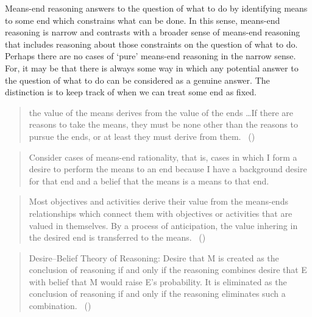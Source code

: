 \documentclass[10pt]{article}
\begin{document}
\newpage



Means-end reasoning answers to the question of what to do by identifying means to some end which constrains what can be done.
In this sense, means-end reasoning is narrow and contrasts with a broader sense of means-end reasoning that includes reasoning about those constraints on the question of what to do.
Perhaps there are no cases of `pure' means-end reasoning in the narrow sense.
For, it may be that there is always some way in which any potential answer to the question of what to do can be considered as a genuine answer.
The distinction is to keep track of when we can treat some end as fixed.







\begin{quote}
  the value of the means derives from the value of the ends \dots If there are reasons to take the means, they must be none other than the reasons to pursue the ends, or at least they must derive from them.\nolinebreak
  \mbox{ }\hfill(\cite[2]{Raz:2005aa})
\end{quote}

\begin{quote}
  Consider cases of means-end rationality, that is, cases in which I form a desire to perform the means to an end because I have a background desire for that end and a belief that the means is a means to that end.\nolinebreak
  \mbox{ }\hfill\cite[84]{Smith:2004aa}
\end{quote}

\begin{quote}
  Most objectives and activities derive their value from the means-ends relationships which connect them with objectives or activities that are valued in themselves. By a process of anticipation, the value inhering in the desired end is transferred to the means.\nolinebreak
  \mbox{ }\hfill(\cite[61]{Simon:1997aa})
\end{quote}

\begin{quote}
  Desire–Belief Theory of Reasoning: Desire that M is created as the conclusion of reasoning if and only if the reasoning combines desire that E with belief that M would raise E’s probability. It is eliminated as the conclusion of reasoning if and only if the reasoning eliminates such a combination.\nolinebreak
  \mbox{ }\hfill(\cite[2]{Sinhababu:2017aa})
\end{quote}
\end{document}
